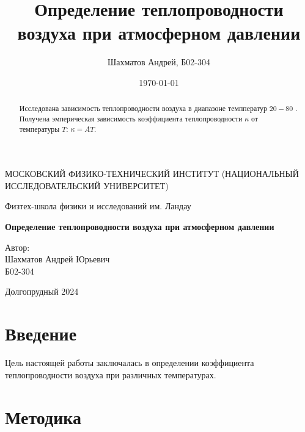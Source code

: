 \documentclass[12pt]{article}
\title{Определение теплопроводности воздуха при атмосферном давлении}
\author{Шахматов Андрей, Б02-304}
\date{\today}
\begin{document}
\begin{titlepage}
    \begin{center}
        {\large МОСКОВСКИЙ ФИЗИКО-ТЕХНИЧЕСКИЙ ИНСТИТУТ (НАЦИОНАЛЬНЫЙ ИССЛЕДОВАТЕЛЬСКИЙ УНИВЕРСИТЕТ)}
    \end{center}
    \begin{center}
        {\large Физтех-школа физики и исследований им. Ландау}
    \end{center}
    
    
    \vspace{3cm}
    {\huge
        \begin{center}
            \textbf{Определение теплопроводности воздуха при атмосферном давлении}
        \end{center}
    }
    \vspace{2cm}
    \begin{flushright}
        {\LARGE Автор:\\ Шахматов Андрей Юрьевич \\
            \vspace{0.2cm}
            Б02-304}
    \end{flushright}
    \vspace{7 cm}
    \begin{center}
        Долгопрудный 2024
    \end{center}
\end{titlepage}


\begin{abstract}
    Исследована зависимость теплопроводности воздуха в диапазоне темпператур \(20 - 80\) \textcelsius. Получена эмперическая 
    зависимость коэффициента теплопроводности \(\kappa \) от температуры \(T\): \(\kappa = A T\).    
\end{abstract}

\tableofcontents

\section{Введение}
Цель настоящей работы заключалась в определении коэффициента теплопроводности воздуха при различных температурах.

\section{Методика}
\end{document}
